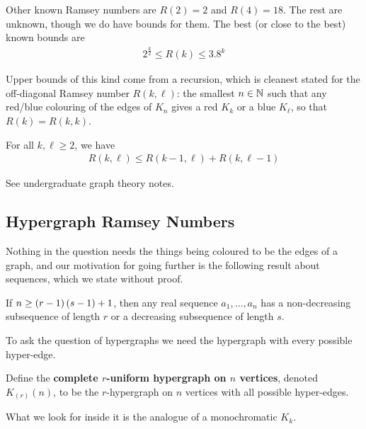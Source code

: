 Other known Ramsey numbers are $R(2) = 2$ and $R(4) = 18$. The rest are unknown, though we do have bounds for them. The best (or close to the best) known bounds are
\begin{align*}
    2^{\frac{k}{2}} \leq R(k) \leq 3.8^k
\end{align*}

Upper bounds of this kind come from a recursion, which is cleanest stated for the off-diagonal Ramsey number $R(k, \ell)$: the smallest $n \in \mathbb{N}$ such that any red/blue colouring of the edges of $K_n$ gives a red $K_k$ or a blue $K_\ell$, so that $R(k) = R(k, k)$.

\begin{boxtheorem} \label{Ch6:Thm:Ramsey_Recursion}
    For all $k, \ell \geq 2$, we have
    \begin{align*}
        R(k, \ell) \leq R(k - 1, \ell) + R(k, \ell - 1)
    \end{align*}
\end{boxtheorem}

See undergraduate graph theory notes. 

\subsection{Hypergraph Ramsey Numbers}

Nothing in the question needs the things being coloured to be the edges of a graph, and our motivation for going further is the following result about sequences, which we state without proof.

\begin{boxtheorem}
    If $n \geq \left( r - 1 \right)\left( s - 1 \right) + 1$, then any real sequence $a_1, \ldots, a_n$ has a non-decreasing subsequence of length $r$ or a decreasing subsequence of length $s$.
\end{boxtheorem}

To ask the question of hypergraphs we need the hypergraph with every possible hyper-edge.

\begin{boxdefinition}
    Define the \textbf{complete $r$-uniform hypergraph on $n$ vertices}, denoted $K_{(r)}(n)$, to be the $r$-hypergraph on $n$ vertices with all possible hyper-edges.
\end{boxdefinition}

What we look for inside it is the analogue of a monochromatic $K_k$.

